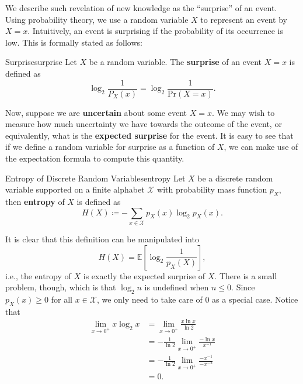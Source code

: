 \documentclass[math, code]{amznotes}
\theoremstyle{remark}
\begin{document}
We describe such revelation of new knowledge as the ``surprise'' of an event. Using probability theory, we use a random variable $X$ to represent an event by $X = x$. Intuitively, an event is surprising if the probability of its occurrence is low. This is formally stated as follows:
\begin{dfnbox}{Surprise}{surprise}
    Let $X$ be a random variable. The {\color{red} \textbf{surprise}} of an event $X = x$ is defined as 
    \begin{equation*}
        \log_2\frac{1}{P_X\left(x\right)} = \log_2\frac{1}{\mathrm{Pr}\left(X = x\right)}.
    \end{equation*}
\end{dfnbox}
Now, suppose we are \textbf{uncertain} about some event $X = x$. We may wish to measure how much uncertainty we have towards the outcome of the event, or equivalently, what is the \textbf{expected surprise} for the event. It is easy to see that if we define a random variable for surprise as a function of $X$, we can make use of the expectation formula to compute this quantity.
\begin{dfnbox}{Entropy of Discrete Random Variables}{entropy}
    Let $X$ be a discrete random variable supported on a finite alphabet $\mathcal{X}$ with probability mass function $p_X$, then {\color{red} \textbf{entropy}} of $X$ is defined as
    \begin{equation*}
        H\left(X\right) \coloneqq -\sum_{x \in \mathcal{X}}p_X\left(x\right)\log_{2}p_X\left(x\right).
    \end{equation*}
\end{dfnbox}
It is clear that this definition can be manipulated into 
\begin{equation*}
    H\left(X\right) = \mathbb{E}\left[\log_2\frac{1}{p_X\left(X\right)}\right],
\end{equation*}
i.e., the entropy of $X$ is exactly the expected surprise of $X$. There is a small problem, though, which is that $\log_2n$ is undefined when $n \leq 0$. Since $p_X\left(x\right) \geq 0$ for all $x \in \mathcal{X}$, we only need to take care of $0$ as a special case. Notice that 
\begin{align*}
    \lim_{x \to 0^+}x\log_2x & = \lim_{x \to 0^+}\frac{x\ln x}{\ln 2} \\
    & = -\frac{1}{\ln 2}\lim_{x \to 0^+}\frac{-\ln x}{x^{-1}} \\
    & = -\frac{1}{\ln 2}\lim_{x \to 0^+}\frac{-x^{-1}}{-x^{-2}} \\
    & = 0.
\end{align*}
\end{document}

